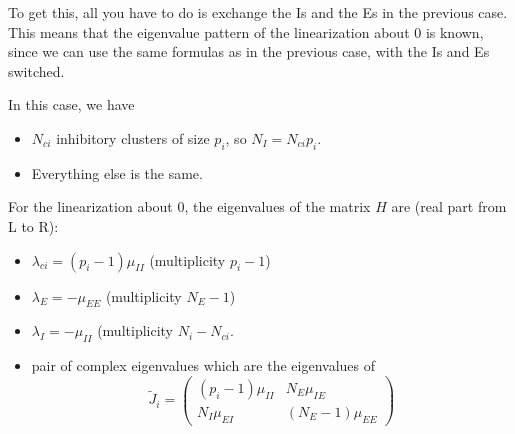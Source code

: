 \documentclass[11pt,reqno]{amsart}
\begin{document}
To get this, all you have to do is exchange the Is and the Es in the previous case. This means that the eigenvalue pattern of the linearization about 0 is known, since we can use the same formulas as in the previous case, with the Is and Es switched.

In this case, we have
\begin{itemize}
    \item $N_{ci}$ inhibitory clusters of size $p_i$, so $N_I = N_{ci} p_i$.
    \item Everything else is the same.
\end{itemize}

\noindent For the linearization about 0, the eigenvalues of the matrix $H$ are (real part from L to R):
\begin{itemize}
    \item $\lambda_{ci} = (p_i - 1)\mu_{II}$ (multiplicity $p_i - 1$)
    \item $\lambda_E = -\mu_{EE}$ (multiplicity $N_E - 1$)
    \item $\lambda_I = -\mu_{II}$ (multiplicity $N_i - N_{ci}$.
    \item pair of complex eigenvalues which are the eigenvalues of
    \[
    \tilde{J}_i = \begin{pmatrix}
    (p_i - 1)\mu_{II} & N_{E} \mu_{IE} \\
    N_I \mu_{EI} & (N_E - 1)\mu_{EE}
    \end{pmatrix}
    \]
\end{itemize}
\end{document}

